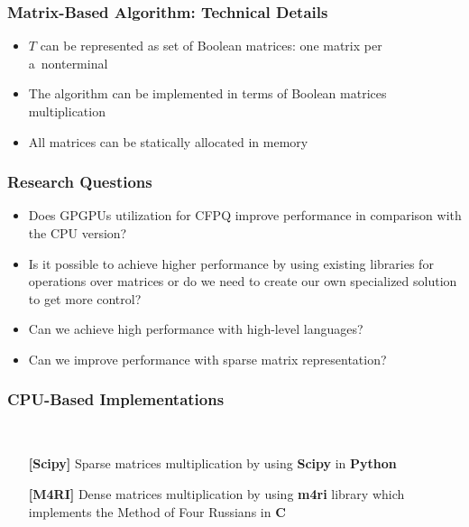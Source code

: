 \documentclass[xcolor=table]{beamer}
\begin{document}
  \begin{frame}[fragile] \frametitle{Matrix-Based Algorithm: Technical Details}
    \begin{itemize}
      \item $T$ can be represented as  set of Boolean matrices: one matrix per a~nonterminal
      \item The algorithm can be implemented in terms of Boolean matrices multiplication
      \item All matrices can be statically allocated in memory
    \end{itemize}
  \end{frame}


\begin{frame}[fragile] \frametitle{Research Questions}
  \begin{itemize}
    \item Does GPGPUs utilization for CFPQ improve performance in comparison with the CPU version?
    \pause
    \item Is it possible to achieve higher performance by using existing libraries for operations over matrices or do we need to create our own specialized solution to get more control?
    \pause
    \item Can we achieve high performance with high-level languages?
    \pause
    \item Can we improve performance with sparse matrix representation?
  \end{itemize}
\end{frame}


\begin{frame}[fragile] \frametitle{CPU-Based Implementations}
  \begin{minipage}[t]{1cm}
\hspace{1cm}
  \end{minipage}
  ~
\begin{minipage}[t]{0.85\textwidth}
\begin{itemize}
  \item[\textbf{[Scipy]}] Sparse matrices multiplication by using \textbf{Scipy} in \textbf{Python}
\pause
  \item[\textbf{[M4RI]}] Dense matrices multiplication by using \textbf{m4ri} library which implements the Method of Four Russians in \textbf{C}
\end{itemize}
\end{minipage}
\end{frame}
\end{document}
